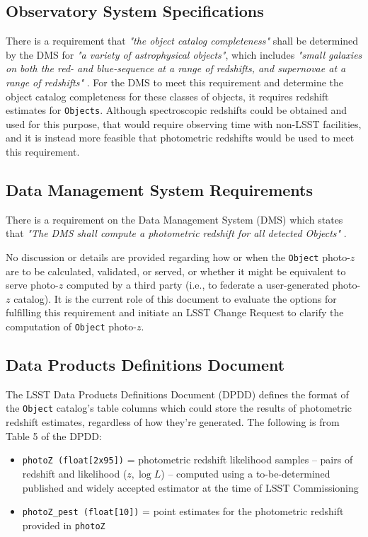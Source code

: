 \documentclass[DM,lsstdraft,toc]{lsstdoc}
\begin{document}
\subsection{Observatory System Specifications}\label{ssec:docs_oss}

There is a requirement that {\it "the object catalog completeness"} shall be determined by the DMS for {\it "a variety of astrophysical objects"}, which includes {\it "small galaxies on both the red- and blue-sequence at a range of redshifts, and supernovae at a range of redshifts"} . 
For the DMS to meet this requirement and determine the object catalog completeness for these classes of objects, it requires redshift estimates for {\tt Objects}.
Although spectroscopic redshifts could be obtained and used for this purpose, that would require observing time with non-LSST facilities, and it is instead more feasible that photometric redshifts would be used to meet this requirement.

\subsection{Data Management System Requirements}\label{ssec:docs_dmsr}

There is a requirement on the Data Management System (DMS) which states that {\it "The DMS shall compute a photometric redshift for all detected Objects"} . 

No discussion or details are provided regarding how or when the {\tt Object} photo-$z$ are to be calculated, validated, or served, or whether it might be equivalent to serve photo-$z$ computed by a third party (i.e., to federate a user-generated photo-$z$ catalog).
It is the current role of this document to evaluate the options for fulfilling this requirement and initiate an LSST Change Request to clarify the computation of {\tt Object} photo-$z$.

\subsection{Data Products Definitions Document}\label{ssec:docs_dpdd}

The LSST Data Products Definitions Document (DPDD)  defines the format of the {\tt Object} catalog's table columns which could store the results of photometric redshift estimates, regardless of how they're generated. 
The following is from Table 5 of the DPDD:
\vspace{-15pt}
\begin{itemize}
\item \texttt{photoZ (float[2x95])} = photometric redshift likelihood samples -- pairs of redshift and likelihood ($z,\log{L}$) -- computed using a to-be-determined published and widely accepted estimator at the time of LSST Commissioning
\item \texttt{photoZ\_pest (float[10])} = point estimates for the photometric redshift provided in {\tt photoZ}
\end{itemize}
\end{document}

